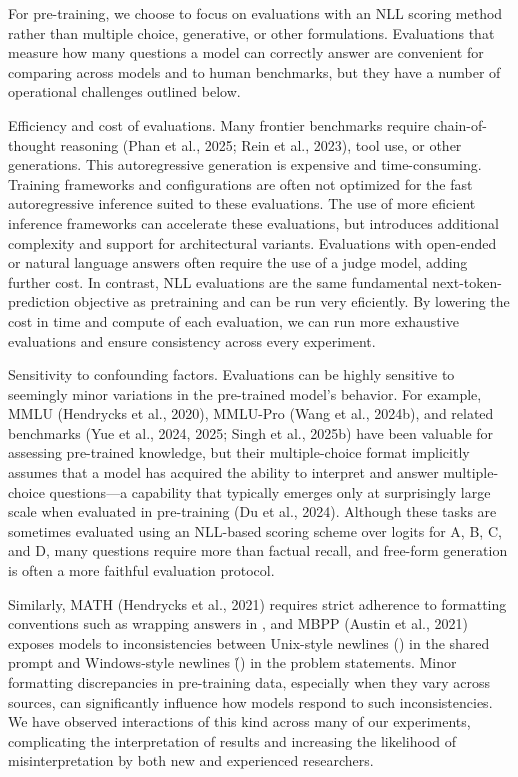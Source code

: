 \documentclass[
  10
]{article}
\begin{document}
For pre-training, we choose to focus on evaluations with an NLL scoring
method rather than multiple choice, generative, or other formulations.
Evaluations that measure how many questions a model can correctly answer
are convenient for comparing across models and to human benchmarks, but
they have a number of operational challenges outlined below.

Efficiency and cost of evaluations. Many frontier benchmarks require
chain-of-thought reasoning (Phan et al., 2025; Rein et al., 2023), tool
use, or other generations. This autoregressive generation is expensive
and time-consuming. Training frameworks and configurations are often not
optimized for the fast autoregressive inference suited to these
evaluations. The use of more eficient inference frameworks can
accelerate these evaluations, but introduces additional complexity and
support for architectural variants. Evaluations with open-ended or
natural language answers often require the use of a judge model, adding
further cost. In contrast, NLL evaluations are the same fundamental
next-token-prediction objective as pretraining and can be run very
eficiently. By lowering the cost in time and compute of each evaluation,
we can run more exhaustive evaluations and ensure consistency across
every experiment.

Sensitivity to confounding factors. Evaluations can be highly sensitive
to seemingly minor variations in the pre-trained model's behavior. For
example, MMLU (Hendrycks et al., 2020), MMLU-Pro (Wang et al., 2024b),
and related benchmarks (Yue et al., 2024, 2025; Singh et al., 2025b)
have been valuable for assessing pre-trained knowledge, but their
multiple-choice format implicitly assumes that a model has acquired the
ability to interpret and answer multiple-choice questions---a capability
that typically emerges only at surprisingly large scale when evaluated
in pre-training (Du et al., 2024). Although these tasks are sometimes
evaluated using an NLL-based scoring scheme over logits for A, B, C, and
D, many questions require more than factual recall, and free-form
generation is often a more faithful evaluation protocol.

Similarly, MATH (Hendrycks et al., 2021) requires strict adherence to
formatting conventions such as wrapping answers in \boxed{}, and MBPP
(Austin et al., 2021) exposes models to inconsistencies between
Unix-style newlines (\n) in the shared prompt and Windows-style newlines
(\r\n) in the problem statements. Minor formatting discrepancies in
pre-training data, especially when they vary across sources, can
significantly influence how models respond to such inconsistencies. We
have observed interactions of this kind across many of our experiments,
complicating the interpretation of results and increasing the likelihood
of misinterpretation by both new and experienced researchers.
\end{document}
